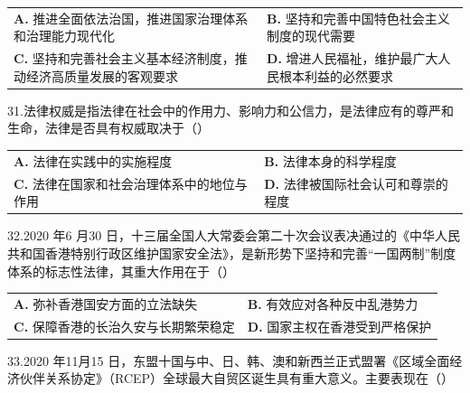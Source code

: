 \documentclass[UTF8,11pt]{ctexart}
\begin{document}
\begin{center}\begin{tabular}{>{\raggedright\arraybackslash}p{\dimexpr(\linewidth-4\tabcolsep)/2\relax}>{\raggedright\arraybackslash}p{\dimexpr(\linewidth-4\tabcolsep)/2\relax}}
\textbf{A.} 推进全面依法治国，推进国家治理体系和治理能力现代化 & \textbf{B.} 坚持和完善中国特色社会主义制度的现代需要\\[.35em]
\textbf{C.} 坚持和完善社会主义基本经济制度，推动经济高质量发展的客观要求 & \textbf{D.} 增进人民福祉，维护最广大人民根本利益的必然要求\\[.35em]\end{tabular}\end{center}

31.法律权威是指法律在社会中的作用力、影响力和公信力，是法律应有的尊严和生命，法律是否具有权威取决于（）


\begin{center}\begin{tabular}{>{\raggedright\arraybackslash}p{\dimexpr(\linewidth-4\tabcolsep)/2\relax}>{\raggedright\arraybackslash}p{\dimexpr(\linewidth-4\tabcolsep)/2\relax}}
\textbf{A.} 法律在实践中的实施程度 & \textbf{B.} 法律本身的科学程度\\[.35em]
\textbf{C.} 法律在国家和社会治理体系中的地位与作用 & \textbf{D.} 法律被国际社会认可和尊崇的程度\\[.35em]\end{tabular}\end{center}

32.2020 年6 月30 日，十三届全国人大常委会第二十次会议表决通过的《中华人民共和国香港特别行政区维护国家安全法》，是新形势下坚持和完善“一国两制”制度体系的标志性法律，其重大作用在于（）


\begin{center}\begin{tabular}{>{\raggedright\arraybackslash}p{\dimexpr(\linewidth-4\tabcolsep)/2\relax}>{\raggedright\arraybackslash}p{\dimexpr(\linewidth-4\tabcolsep)/2\relax}}
\textbf{A.} 弥补香港国安方面的立法缺失 & \textbf{B.} 有效应对各种反中乱港势力\\[.35em]
\textbf{C.} 保障香港的长治久安与长期繁荣稳定 & \textbf{D.} 国家主权在香港受到严格保护\\[.35em]\end{tabular}\end{center}

33.2020 年11月15 日，东盟十国与中、日、韩、澳和新西兰正式盟署《区域全面经济伙伴关系协定》（RCEP）全球最大自贸区诞生具有重大意义。主要表现在（）
\end{document}
